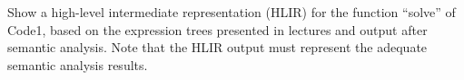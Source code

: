 \documentclass[docid=2021]{comp_exam_round1}
\begin{document}
\begin{center}
\end{center}

\question
Show a high-level intermediate representation (HLIR) for the function “solve” of Code1, based on the expression trees presented in lectures and output after semantic analysis. Note that the HLIR output must represent the adequate semantic analysis results.

\ansseparator
\end{document}
